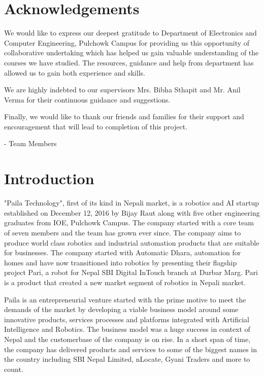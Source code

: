 \documentclass[12pt,a4paper]{scrreprt}
\begin{document}

\chapter*{Acknowledgements}
\thispagestyle{empty}
We would like to express our deepest gratitude to Department of Electronics and Computer Engineering, Pulchowk Campus for providing us this opportunity of collaborative undertaking which has helped us gain valuable understanding of the courses we have studied. The resources, guidance and help from department has allowed us to gain both experience and skills.

We are highly indebted to our supervisors Mrs. Bibha Sthapit and Mr. Anil Verma for their continuous guidance and suggestions.

Finally, we would like to thank our friends and families for their support and encouragement that will lead to completion of this project.

- Team Members

\clearpage
\tableofcontents
\listoffigures
\listoftables
\clearpage
{}

\chapter{Introduction}
"Paila Technology", first of its kind in Nepali market, is a robotics and AI startup established on December 12, 2016 by Bijay Raut along with five other engineering graduates from IOE, Pulchowk Campus. The company started with a core team of seven members and the team has grown ever since. The company aims to produce world class robotics and industrial automation products that are suitable for businesses.
The company started with Automatic Dhara, automation for homes and have now transitioned into robotics by presenting their flagship project Pari, a robot for Nepal SBI Digital InTouch branch at Durbar Marg. Pari is a product that created a new market segment of robotics in Nepali market.

Paila is an entrepreneurial venture started with the prime motive to meet the demands of the market by developing a viable business model around some innovative products, services processes and platforms integrated with Artificial Intelligence and Robotics. The business model was a huge success in context of Nepal and the customerbase of the company is on rise. In a short span of time, the company has delivered products and services to some of the biggest names in the country including SBI Nepal Limited, nLocate, Gyani Traders and more to count.
\end{document}
